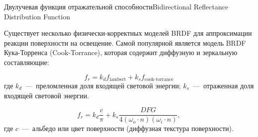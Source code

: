 \documentclass{beamer}
\begin{document}
	\begin{frame}{Двулучевая функция отражательной способности}{Bidirectional Reflectance Distribution Function}

		Существует несколько физически-корректных моделей BRDF для аппроксимации реакции поверхности на освещение. Самой популярной является модель BRDF Кука-Торренса 
		(Cook-Torrance), которая содержит диффузную и зеркальную составляющие:
		
		\[
			f_r =
			k_d f_{\text{lambert}}
			+
			k_s f_{\text{cook-torrance}} 	
		\]
		где 
		$k_d$~---~преломленная доля входящей световой энергии;
		$k_s$~---~отраженная доля входящей световой энергии.

		\[
			f_r =
			k_d \frac{c}{\pi} 
			+
			k_s \frac{DFG}{4 (\omega_o \cdot n) (\omega_i \cdot n)} 	
		,
			\]
		где 
		$c$~---~альбедо или цвет поверхности (диффузная текстура поверхности).

		
		
		
		\note{


			
		}
	\end{frame}
\end{document}
